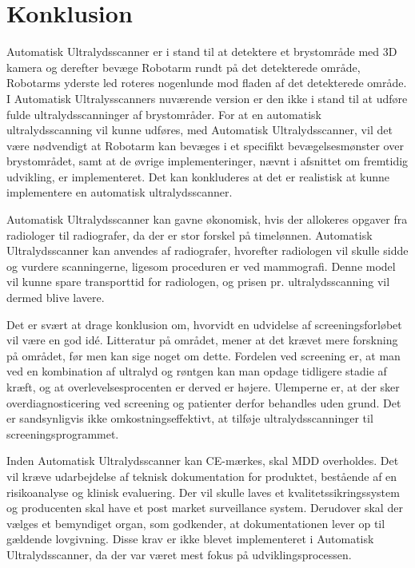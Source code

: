 \chapter{Konklusion}\label{kapitel_Konklusion}
Automatisk Ultralydsscanner er i stand til at detektere et brystområde med 3D kamera og derefter bevæge Robotarm rundt på det detekterede område, Robotarms yderste led roteres nogenlunde mod fladen af det detekterede område. I Automatisk Ultralysscanners nuværende version er den ikke i stand til at udføre fulde ultralydsscanninger af brystområder. For at en automatisk ultralydsscanning vil kunne udføres, med Automatisk Ultralydsscanner, vil det være nødvendigt at Robotarm kan bevæges i et specifikt bevægelsesmønster over brystområdet, samt at de øvrige implementeringer, nævnt i afsnittet om fremtidig udvikling, er implementeret. Det kan konkluderes at det er realistisk at kunne implementere en automatisk ultralydsscanner. 

Automatisk Ultralydsscanner kan gavne økonomisk, hvis der allokeres opgaver fra radiologer til radiografer, da der er stor forskel på timelønnen. Automatisk Ultralydsscanner kan anvendes af radiografer, hvorefter radiologen vil skulle sidde og vurdere scanningerne, ligesom proceduren er ved mammografi. Denne model vil kunne spare transporttid for radiologen, og prisen pr. ultralydsscanning vil dermed blive lavere. 

Det er svært at drage konklusion om, hvorvidt en udvidelse af screeningsforløbet vil være en god idé. Litteratur på området, mener at det krævet mere forskning på området, før men kan sige noget om dette. Fordelen ved screening er, at man ved en kombination af ultralyd og røntgen kan man opdage tidligere stadie af kræft, og at overlevelsesprocenten er derved er højere. Ulemperne er, at der sker overdiagnosticering ved screening og patienter derfor behandles uden grund. Det er sandsynligvis ikke omkostningseffektivt, at tilføje ultralydsscanninger til screeningsprogrammet. 

Inden Automatisk Ultralydsscanner kan CE-mærkes, skal MDD overholdes. Det vil kræve udarbejdelse af teknisk dokumentation for produktet, bestående af en risikoanalyse og klinisk evaluering. Der vil skulle laves et kvalitetssikringssystem og producenten skal have et post market surveillance system. Derudover skal der vælges et bemyndiget organ, som godkender, at dokumentationen lever op til gældende lovgivning. Disse krav er ikke blevet implementeret i Automatisk Ultralydsscanner, da der var været mest fokus på udviklingsprocessen. 

